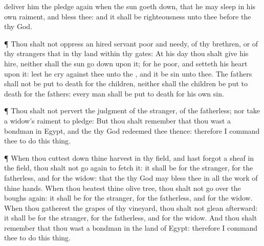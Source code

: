 {deliver him the
pledge
again when the
sun goeth
down, that he may
sleep in his own
raiment, and
bless thee: and it shall be
righteousness unto thee
before the
{} thy
God.
\par }{\PP {}¶ Thou shalt not
oppress an hired
servant
{}
poor and
needy,
{} of thy
brethren, or of thy
strangers that
{} in thy
land within thy
gates:
At his
day thou shalt
give
{} his
hire, neither shall the
sun go
down upon it; for he
{}
poor, and
setteth his
heart upon it: lest he
cry against thee unto the
{}, and it be
sin unto thee.
The
fathers shall not be put to
death for the
children, neither shall the
children be put to
death for the
fathers: every
man shall be put to
death for his own
sin.
\par }{\PP {}¶ Thou shalt not
pervert the
judgment of the
stranger,
{} of the
fatherless; nor
take a
widow’s
raiment to
pledge:
But thou shalt
remember that thou wast a
bondman in
Egypt, and the
{} thy
God
redeemed thee thence: therefore I
command thee to
do this
thing.
\par }{\PP {}¶ When thou cuttest
down thine
harvest in thy
field, and hast
forgot a
sheaf in the
field, thou shalt not go
again to
fetch it: it shall be for the
stranger, for the
fatherless, and for the
widow: that the
{} thy
God may
bless thee in all the
work of thine
hands.
When thou
beatest thine olive
tree, thou shalt not go over the
boughs
again: it shall be for the
stranger, for the
fatherless, and for the
widow.
When thou
gatherest the grapes of thy
vineyard, thou shalt not
glean
{}
afterward: it shall be for the
stranger, for the
fatherless, and for the
widow.
And thou shalt
remember that thou wast a
bondman in the
land of
Egypt: therefore I
command thee to
do this
thing.

}
